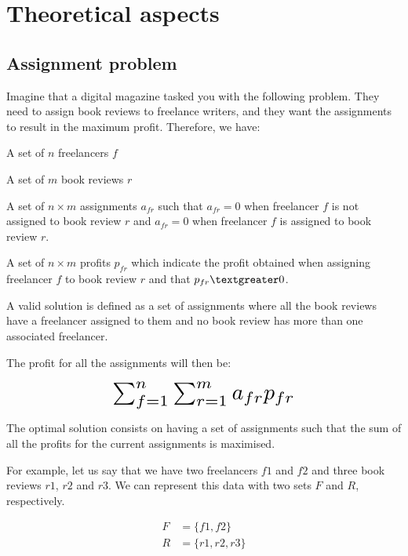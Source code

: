 \renewcommand{\documentname}{Theoretical Aspects}

\chapter{Theoretical aspects}\label{theory}


\section{Assignment problem}

Imagine that a digital magazine tasked you with the following problem. They need to assign book reviews to freelance writers, and they want the assignments to result in the maximum profit. Therefore, we have:

\begin{description}
    \item A set of $n$ freelancers $f$
    \item A set of $m$ book reviews $r$
    \item A set of $n \times m$ assignments $a_{fr}$ such that $a_{fr} = 0$ when freelancer $f$ is not assigned to book review $r$ and $a_{fr} = 0$ when freelancer $f$ is assigned to book review $r$.
    \item A set of $n \times m$ profits $p_{fr}$ which indicate the profit obtained when assigning freelancer $f$ to book review $r$ and that $p_{fr} \textgreater 0$.
    \item A valid solution is defined as a set of assignments where all the book reviews have a freelancer assigned to them and no book review has more than one associated freelancer.
\end{description}

The profit for all the assignments will then be:

\begin{equation}
    \scalebox{2}{$\sum_{f=1}^n \sum_{r=1}^m a_{fr} p_{fr}$}
\end{equation}

The optimal solution consists on having a set of assignments such that the sum of all the profits for the current assignments is maximised.

For example, let us say that we have two freelancers $f1$ and $f2$ and three book reviews $r1$, $r2$ and $r3$. We can represent this data with two sets $F$ and $R$, respectively.

\begin{align}
    F &= \{ f1, f2 \} \\
    R &= \{ r1, r2, r3 \}
\end{align}

